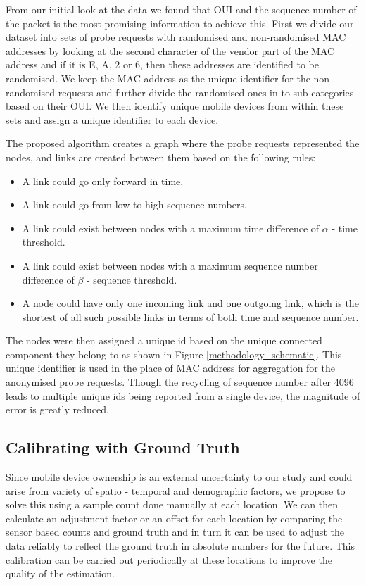 From our initial look at the data we found that OUI and the sequence
number of the packet is the most promising information to achieve this.
First we divide our dataset into sets of probe requests with randomised and
non-randomised MAC addresses by looking at the second character of the vendor
part of the MAC address and if it is E, A, 2 or 6, then these addresses are
identified to be randomised. We keep the MAC address as the unique
identifier for the non-randomised requests and further divide the randomised ones in to
sub categories based on their OUI. We then  
identify unique mobile devices from within these sets and assign a unique identifier to each device.

The proposed algorithm creates a graph where the probe requests represented the
nodes, and links are created between them based on the following rules:

\begin{itemize} 
\item A link could go only forward in time. 
\item A link could go from low to high sequence numbers. 
\item A link could exist between nodes with a maximum time difference of
	$\alpha$ - time threshold. 
\item A link could exist between nodes with a maximum sequence number
	difference of $\beta$ - sequence threshold.
\item A node could have only one incoming link and one outgoing link, which is
	the shortest of all such possible links in terms of both time and sequence
	number.
\end{itemize}

The nodes were then assigned a unique id based on the unique connected component
they belong to as shown in Figure \ref{methodology_schematic}. This unique
identifier is used in the place of MAC address for aggregation for the
anonymised probe requests. Though the recycling of sequence number after 4096
leads to multiple unique ids being reported from a single device, the magnitude
of error is greatly reduced. 

\subsection{Calibrating with Ground Truth} 

Since mobile device ownership is an external uncertainty to our study and could
arise from variety of spatio - temporal and demographic factors, we propose to
solve this using a sample count done manually at each location.  We can then
calculate an  adjustment factor or an offset for each location by comparing the
sensor based counts and ground truth and in turn it can be used to adjust the
data reliably to reflect the ground truth in absolute numbers for the future.
This calibration can be carried out periodically at these locations to improve
the quality of the estimation.
